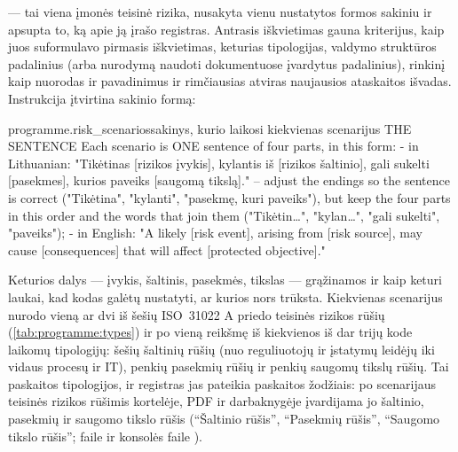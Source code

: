  --- tai viena įmonės teisinė rizika, nusakyta vienu nustatytos formos
sakiniu ir apsupta to, ką apie ją įrašo registras. Antrasis iškvietimas gauna kriterijus,
kaip juos suformulavo pirmasis iškvietimas, keturias tipologijas, valdymo struktūros
padalinius (arba nurodymą naudoti dokumentuose įvardytus padalinius), rinkinį kaip nuorodas ir
pavadinimus ir rimčiausias atviras naujausios ataskaitos išvadas. Instrukcija
 įtvirtina sakinio formą:

\begin{promptexcerpt}{programme.risk_scenarios}{sakinys, kurio laikosi kiekvienas scenarijus}
THE SENTENCE
Each scenario is ONE sentence of four parts, in this form:
- in Lithuanian: "Tikėtinas [rizikos įvykis], kylantis iš [rizikos šaltinio], gali sukelti [pasekmes], kurios paveiks [saugomą tikslą]." – adjust the endings so the sentence is correct ("Tikėtina", "kylanti", "pasekmę, kuri paveiks"), but keep the four parts in this order and the words that join them ("Tikėtin…", "kylan…", "gali sukelti", "paveiks");
- in English: "A likely [risk event], arising from [risk source], may cause [consequences] that will affect [protected objective]."
\end{promptexcerpt}

Keturios dalys --- įvykis, šaltinis, pasekmės, tikslas --- grąžinamos ir kaip keturi laukai,
kad kodas galėtų nustatyti, ar kurios nors trūksta. Kiekvienas scenarijus nurodo vieną ar dvi
iš šešių ISO~31022 A priedo teisinės rizikos rūšių (\cref{tab:programme:types}) ir po vieną
reikšmę iš kiekvienos iš dar trijų kode laikomų tipologijų: šešių šaltinių rūšių (nuo
reguliuotojų ir įstatymų leidėjų iki vidaus procesų ir IT), penkių pasekmių rūšių ir penkių
saugomų tikslų rūšių.
Tai paskaitos tipologijos, ir registras jas pateikia paskaitos žodžiais: po scenarijaus
teisinės rizikos rūšimis kortelėje, PDF ir darbaknygėje įvardijama jo šaltinio, pasekmių ir
saugomo tikslo rūšis (\enquote{Šaltinio rūšis},
\enquote{Pasekmių rūšis}, \enquote{Saugomo tikslo rūšis};  faile
 ir konsolės faile ).


